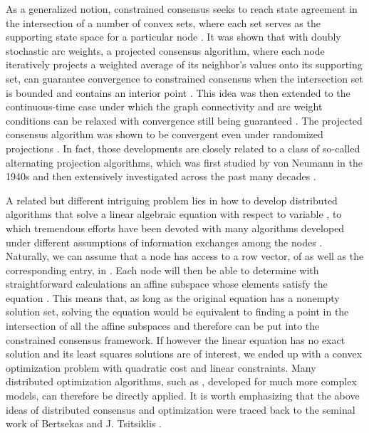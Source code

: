 \documentclass[a4paper, 11pt]{article}
\begin{document}
As a generalized  notion, constrained consensus seeks to reach state agreement  in the intersection of a number of convex sets, where each set serves  as the   supporting state space for a particular node \cite{nedic10}. It was shown that with doubly stochastic arc weights, a projected consensus algorithm,  where each node iteratively projects a weighted average of its neighbor's values onto its supporting set,  can guarantee convergence to constrained consensus when the intersection set is bounded and contains an interior point \cite{nedic10}. This idea was then extended to the continuous-time case under which the graph connectivity and arc weight conditions can be relaxed with convergence still being guaranteed \cite{shitac}. The projected consensus algorithm was shown to be convergent  even under randomized projections \cite{shiauto}.  In fact, those developments are closely related to a class of so-called alternating projection algorithms,  which was first studied by von Neumann in the 1940s \cite{jvn49} and then extensively investigated across the past many decades \cite{aron50, gubin1967,deut83,B-B-SIAM}.


A related but different   intriguing problem  lies in how to develop distributed algorithms that solve a linear algebraic equation  with respect to variable , to which tremendous efforts have been devoted with many algorithms developed under different assumptions of information exchanges among the nodes \cite{anderson97, mehmood05, lu09-1,lu09-2,liu13,mou13,Morse-TAC15, asuman14, jadbabaie15, brian15}. Naturally, we can assume that a node  has access to a row vector,   of  as well as the corresponding entry,   in . Each node will then be able to determine with straightforward calculations an affine subspace whose elements satisfy the equation . This means that, as long as the original equation  has a nonempty solution set, solving the equation would be equivalent to finding a point in the intersection of all the affine subspaces and therefore  can be put into the constrained consensus framework. If however the linear equation has no exact solution and  its least squares solutions are of interest, we ended up with a convex optimization problem with quadratic cost and linear constraints. Many distributed optimization algorithms, such as \cite{nedic09,nedic10,elia,jmf,nedic11,Rabbat2012,lu12,cotes14,jakovetic14}, developed for much more complex models, can therefore be directly applied. It is worth emphasizing that the above ideas of distributed consensus and optimization were traced back to the seminal work of Bertsekas and J. Tsitsiklis \cite{tsi,tsibook}.
\end{document}
